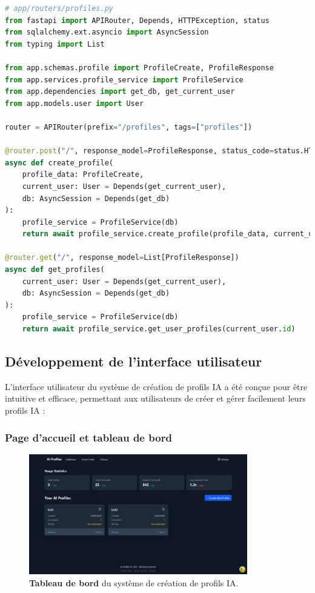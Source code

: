 \begin{lstlisting}[style=codestyle, language=Python]
# app/routers/profiles.py
from fastapi import APIRouter, Depends, HTTPException, status
from sqlalchemy.ext.asyncio import AsyncSession
from typing import List

from app.schemas.profile import ProfileCreate, ProfileResponse
from app.services.profile_service import ProfileService
from app.dependencies import get_db, get_current_user
from app.models.user import User

router = APIRouter(prefix="/profiles", tags=["profiles"])

@router.post("/", response_model=ProfileResponse, status_code=status.HTTP_201_CREATED)
async def create_profile(
    profile_data: ProfileCreate,
    current_user: User = Depends(get_current_user),
    db: AsyncSession = Depends(get_db)
):
    profile_service = ProfileService(db)
    return await profile_service.create_profile(profile_data, current_user.id)

@router.get("/", response_model=List[ProfileResponse])
async def get_profiles(
    current_user: User = Depends(get_current_user),
    db: AsyncSession = Depends(get_db)
):
    profile_service = ProfileService(db)
    return await profile_service.get_user_profiles(current_user.id)
\end{lstlisting}

\subsection{Développement de l'interface utilisateur}

L'interface utilisateur du système de création de profils IA a été conçue pour être intuitive et efficace, permettant aux utilisateurs de créer et gérer facilement leurs profils IA :

\subsubsection{Page d'accueil et tableau de bord}

\begin{figure}[H]
  \centering
  \includegraphics[width=0.85\textwidth,keepaspectratio]{pfe-pics/ai-profile-creation/Screenshot 2025-06-09 at 23-15-45 Vite React TS.png}
  \caption{\textbf{Tableau de bord} du système de création de profils IA.}
  \label{fig:ai_dashboard}
\end{figure}

